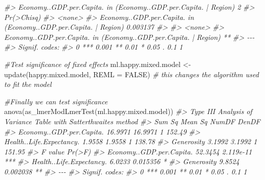 \documentclass[
]{book}
\newenvironment{Shaded}{\begin{snugshade}}{\end{snugshade}}
\newcommand{\AttributeTok}[1]{\textcolor[rgb]{0.77,0.63,0.00}{#1}}
\newcommand{\CommentTok}[1]{\textcolor[rgb]{0.56,0.35,0.01}{\textit{#1}}}
\newcommand{\ConstantTok}[1]{\textcolor[rgb]{0.00,0.00,0.00}{#1}}
\newcommand{\FunctionTok}[1]{\textcolor[rgb]{0.00,0.00,0.00}{#1}}
\newcommand{\NormalTok}[1]{#1}
\newcommand{\OtherTok}[1]{\textcolor[rgb]{0.56,0.35,0.01}{#1}}
\theoremstyle{definition}
\theoremstyle{definition}
\theoremstyle{definition}
\theoremstyle{definition}
\theoremstyle{remark}
\begin{document}
\begin{Shaded}
\begin{Highlighting}[]
\CommentTok{\#\textgreater{} Economy..GDP.per.Capita. in (Economy..GDP.per.Capita. | Region)  2}
\CommentTok{\#\textgreater{}                                                                 Pr(\textgreater{}Chisq)}
\CommentTok{\#\textgreater{} \textless{}none\textgreater{}                                                                    }
\CommentTok{\#\textgreater{} Economy..GDP.per.Capita. in (Economy..GDP.per.Capita. | Region)   0.003137}
\CommentTok{\#\textgreater{}                                                                   }
\CommentTok{\#\textgreater{} \textless{}none\textgreater{}                                                            }
\CommentTok{\#\textgreater{} Economy..GDP.per.Capita. in (Economy..GDP.per.Capita. | Region) **}
\CommentTok{\#\textgreater{} {-}{-}{-}}
\CommentTok{\#\textgreater{} Signif. codes:  }
\CommentTok{\#\textgreater{} 0 \textquotesingle{}***\textquotesingle{} 0.001 \textquotesingle{}**\textquotesingle{} 0.01 \textquotesingle{}*\textquotesingle{} 0.05 \textquotesingle{}.\textquotesingle{} 0.1 \textquotesingle{} \textquotesingle{} 1}

\CommentTok{\#Test significance of fixed effects}
\NormalTok{ml.happy.mixed.model }\OtherTok{\textless{}{-}} \FunctionTok{update}\NormalTok{(happy.mixed.model, }\AttributeTok{REML =} \ConstantTok{FALSE}\NormalTok{) }\CommentTok{\# this changes the algorithm used to fit the model}

\CommentTok{\#Finally we can test significance}
\FunctionTok{anova}\NormalTok{(}\FunctionTok{as\_lmerModLmerTest}\NormalTok{(ml.happy.mixed.model))}
\CommentTok{\#\textgreater{} Type III Analysis of Variance Table with Satterthwaite\textquotesingle{}s method}
\CommentTok{\#\textgreater{}                           Sum Sq Mean Sq NumDF  DenDF}
\CommentTok{\#\textgreater{} Economy..GDP.per.Capita. 16.9971 16.9971     1 152.49}
\CommentTok{\#\textgreater{} Health..Life.Expectancy.  1.9558  1.9558     1 138.78}
\CommentTok{\#\textgreater{} Generosity                3.1992  3.1992     1 151.95}
\CommentTok{\#\textgreater{}                          F value    Pr(\textgreater{}F)    }
\CommentTok{\#\textgreater{} Economy..GDP.per.Capita. 52.3454 2.119e{-}11 ***}
\CommentTok{\#\textgreater{} Health..Life.Expectancy.  6.0233  0.015356 *  }
\CommentTok{\#\textgreater{} Generosity                9.8524  0.002038 ** }
\CommentTok{\#\textgreater{} {-}{-}{-}}
\CommentTok{\#\textgreater{} Signif. codes:  }
\CommentTok{\#\textgreater{} 0 \textquotesingle{}***\textquotesingle{} 0.001 \textquotesingle{}**\textquotesingle{} 0.01 \textquotesingle{}*\textquotesingle{} 0.05 \textquotesingle{}.\textquotesingle{} 0.1 \textquotesingle{} \textquotesingle{} 1}
\end{Highlighting}
\end{Shaded}
\end{document}
